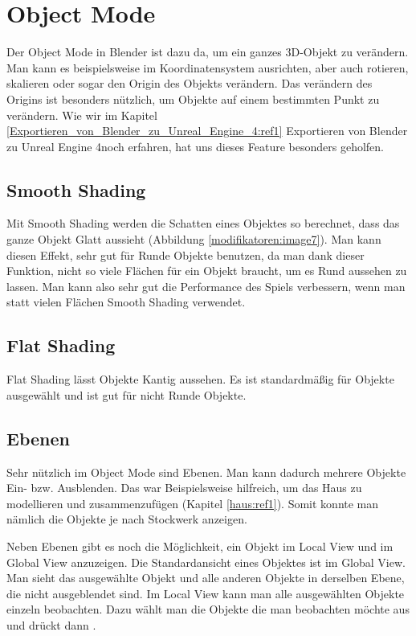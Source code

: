 \section{Object Mode}
Der Object Mode in Blender ist dazu da, um ein ganzes 3D-Objekt zu verändern. Man kann es beispielsweise im Koordinatensystem ausrichten, aber
auch rotieren, skalieren oder sogar den Origin des Objekts verändern. Das verändern des Origins ist besonders nützlich, um Objekte auf
einem bestimmten Punkt zu verändern. Wie wir im Kapitel \ref{Exportieren_von_Blender_zu_Unreal_Engine_4:ref1} \dq {} Exportieren von Blender zu Unreal Engine 4\dq noch erfahren, hat uns dieses Feature besonders geholfen.

\subsection{Smooth Shading}
\label{objectMode:smoothshading}
Mit Smooth Shading werden die Schatten eines Objektes so berechnet, dass das ganze Objekt Glatt aussieht (Abbildung \ref{modifikatoren:image7}).
Man kann diesen Effekt, sehr gut für Runde Objekte benutzen, da man dank dieser Funktion, nicht so viele Flächen für ein Objekt braucht, um
es Rund aussehen zu lassen. Man kann also sehr gut die Performance des Spiels verbessern, wenn man statt vielen Flächen Smooth Shading verwendet.

\subsection{Flat Shading}
Flat Shading lässt Objekte Kantig aussehen. Es ist standardmäßig für Objekte ausgewählt und ist gut für nicht Runde Objekte.

\subsection{Ebenen}
Sehr nützlich im Object Mode sind Ebenen. Man kann dadurch mehrere Objekte Ein- bzw. Ausblenden.
Das war Beispielsweise hilfreich, um das Haus zu modellieren und zusammenzufügen (Kapitel \ref{haus:ref1}).
Somit konnte man nämlich die Objekte je nach Stockwerk anzeigen.

Neben Ebenen gibt es noch die Möglichkeit, ein Objekt im Local View und im Global View anzuzeigen.
Die Standardansicht eines Objektes ist im Global View. Man sieht das ausgewählte Objekt und alle anderen Objekte in derselben Ebene, die nicht ausgeblendet sind.
Im Local View kann man alle ausgewählten Objekte einzeln beobachten. Dazu wählt man die Objekte die man beobachten möchte aus und drückt dann .

